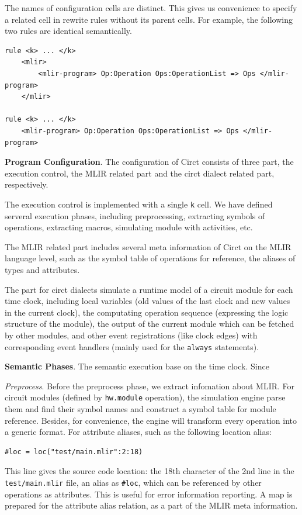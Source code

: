 The names of configuration cells are distinct. This gives us convenience to specify a related cell in rewrite rules without its parent cells. For example, the following two rules are identical semantically.
\begin{lstlisting}
rule <k> ... </k>
    <mlir>
        <mlir-program> Op:Operation Ops:OperationList => Ops </mlir-program>
    </mlir>

rule <k> ... </k>
    <mlir-program> Op:Operation Ops:OperationList => Ops </mlir-program>
\end{lstlisting}

\smallskip
\textbf{Program Configuration}.
The configuration of Circt consists of three part, the execution control, the MLIR related part and the circt dialect related part, respectively.

The execution control is implemented with a single \verb|k| cell. We have defined serveral execution phases, including preprocessing, extracting symbols of operations, extracting macros, simulating module with activities, etc.

The MLIR related part includes several meta information of Circt on the MLIR language level, such as the symbol table of operations for reference, the aliases of types and attributes.

The part for circt dialects simulate a runtime model of a circuit module for each time clock, including local variables (old values of the last clock and new values in the current clock), the computating operation sequence (expressing the logic structure of the module), the output of the current module which can be fetched by other modules, and other event registrations (like clock edges) with corresponding event handlers (mainly used for the \verb|always| statements).

\smallskip
\textbf{Semantic Phases}.
The semantic execution base on the time clock. Since 

\smallskip
\textit{Preprocess}.
Before the preprocess phase, we extract infomation about MLIR. For circuit modules (defined by \verb|hw.module| operation), the simulation engine parse them and find their symbol names and construct a symbol table for module reference. Besides, for convenience, the engine will transform every operation into a generic format. For attribute aliases, such as the following location alias:
\begin{lstlisting}[basicstyle=\scriptsize\ttfamily]
#loc = loc("test/main.mlir":2:18)
\end{lstlisting}
This line gives the source code location: the 18th character of the 2nd line in the \verb|test/main.mlir| file, an alias as \verb|#loc|, which can be referenced by other operations as attributes. This is useful for error information reporting. A map is prepared for the attribute alias relation, as a part of the MLIR meta information.

